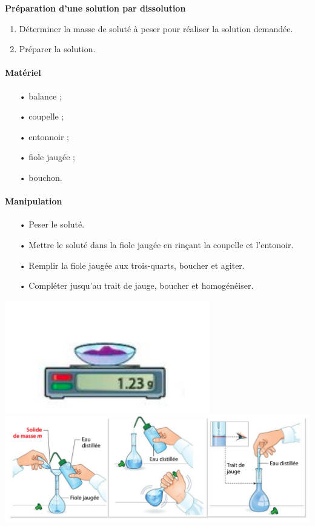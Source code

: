 \begin{bframe}
\textbf{Préparation d'une solution par dissolution}
\begin{enumerate}
\item Déterminer la masse de soluté à peser pour réaliser la solution demandée.

\item Préparer la solution.
\end{enumerate}

\begin{multicols}{2}
\paragraph*{Matériel}
\begin{itemize}
\item[•] balance ;
\item[•] coupelle ;
\item[•] entonnoir ;
\item[•] fiole jaugée ;
\item[•] bouchon.
\end{itemize}

\newpage

\paragraph*{Manipulation}
\begin{itemize}
\item[•] Peser le soluté.
\item[•] Mettre le soluté dans la fiole jaugée en rinçant la coupelle et l'entonoir.
\item[•] Remplir la fiole jaugée aux trois-quarts, boucher et agiter.
\item[•] Compléter jusqu'au trait de jauge, boucher et homogénéiser.
\end{itemize}
\end{multicols}

\begin{center}
\includegraphics[scale=0.45]{images/pesee.png}
\includegraphics[scale=0.35]{images/dissolution.png}
\end{center}

\end{bframe}

